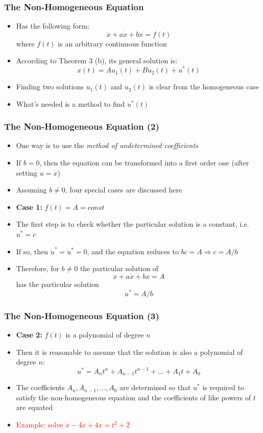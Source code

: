 \documentclass[10pt,usenames,dvipsnames]{beamer}
\theoremstyle{definition}
\begin{document}
\begin{frame}[fragile]
\frametitle{The Non-Homogeneous Equation}
\begin{itemize}
	\item Has the following form:
	\[
		\ddot{x} + a\dot{x} + bx = f(t)
	\]
	where $f(t)$ is an arbitrary continuous function 
	\item According to Theorem 3 (b), its general solution is:
	\[
		x(t) = Au_{1}(t) + Bu_{2}(t) + u^{*}(t)
	\]
	\item Finding two solutions $u_{1}(t)$ and $u_{2}(t)$ is clear from the homogeneous case
	\item What's needed is a method to find $u^{*}(t)$
\end{itemize}
\end{frame}

\begin{frame}[fragile]
\frametitle{The Non-Homogeneous Equation (2)}
\begin{itemize}
	\item One way is to use the \textit{method of undetermined coefficients}
	\item If $b = 0$, then the equation can be transformed into a first order one (after setting $u = \dot{x}$)
	\item Assuming $b \neq 0$, four special cases are discussed here
	\item \textbf{Case 1:} $f(t) = A = const$
	\item The first step is to check whether the particular solution is a constant, i.e. $u^{*} = c$
	\item If so, then $\dot{u}^{*} = \ddot{u}^{*} = 0$, and the equation reduces to $bc = A \Rightarrow c = A/b$
	\item Therefore, for $b \neq 0$ the particular solution of 
	\[
		\ddot{x} + a\dot{x} + bx = A
	\]
	has the particular solution
	\[
		u^{*} = A/b
	\]
\end{itemize}
\end{frame}

\begin{frame}[fragile]
\frametitle{The Non-Homogeneous Equation (3)}
\begin{itemize}
	\item \textbf{Case 2:} $f(t)$ is a polynomial of degree $n$
	\item Then it is reasonable to assume that the solution is also a polynomial of degree $n$:
	\[
		u^{*} = A_{n}t^{n} + A_{n-1}t^{n-1} + \ldots + A_{1}t + A_{0}
	\]
	\item The coefficients $A_{n}, A_{n-1},\ldots,A_{0}$ are determined so that $u^{*}$ is required to satisfy the non-homogeneous equation and the coefficients of like powers of $t$ are equated
	\item \textcolor{red}{Example: solve $\ddot{x} - 4\dot{x} + 4x = t^{2} + 2$}
\end{itemize}
\end{frame}
\end{document}
